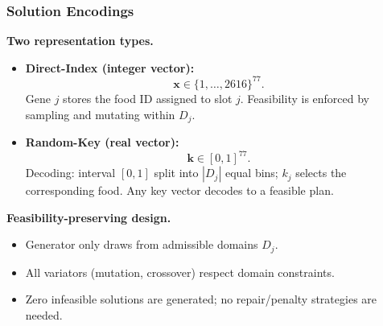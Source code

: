 \documentclass[aspectratio=169,10pt]{beamer}
\begin{document}
\begin{frame}
\frametitle{Solution Encodings}

\textbf{Two representation types.}

\begin{itemize}
  \item \textbf{Direct-Index (integer vector):}
  \[
  \mathbf{x} \in \{1,\dots,2616\}^{77}.
  \]
  Gene $j$ stores the food ID assigned to slot $j$.
  Feasibility is enforced by sampling and mutating within $D_j$.

  \item \textbf{Random-Key (real vector):}
  \[
  \mathbf{k} \in [0,1]^{77}.
  \]
  Decoding: interval $[0,1]$ split into $|D_j|$ equal bins; $k_j$ selects the corresponding food.
  Any key vector decodes to a feasible plan.
\end{itemize}

\vspace{0.3cm}

\textbf{Feasibility-preserving design.}
\begin{itemize}
  \item Generator only draws from admissible domains $D_j$.
  \item All variators (mutation, crossover) respect domain constraints.
  \item Zero infeasible solutions are generated; no repair/penalty strategies are needed.
\end{itemize}

\end{frame}
\end{document}
